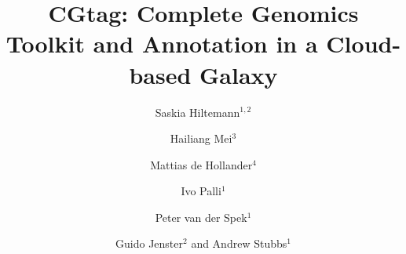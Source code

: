 \documentclass[10pt]{bmc_article}
\newenvironment{bmcformat}{\begin{raggedright}\baselineskip20pt\sloppy\setboolean{publ}{false}}{\end{raggedright}\baselineskip20pt\sloppy}
\begin{document}
\begin{bmcformat}



\title{CGtag: Complete Genomics Toolkit and Annotation in a Cloud-based Galaxy}
 


\author{Saskia Hiltemann\correspondingauthor$^{1,2}$%
      \and
         Hailiang Mei$^3$%
       \and
         Mattias de Hollander$^4$%
       \and
         Ivo Palli$^1$%
       \and
         Peter van der Spek$^1$%
       \and
         Guido Jenster$^2$ %
       and
         Andrew Stubbs$^1$%
      }
      


\address{%
    \iid(1)Department of Bioinformatics, Erasmus MC, Rotterdam, %
         The Netherlands\\
    \iid(2)Department of Urology, Erasmus MC, Rotterdam, %
         The Netherlands\\    
    \iid(3)Netherlands Bioinformatics Center (NBIC), Nijmegen, The Netherlands \\
    \iid(4)Department of Microbial Ecology, Netherlands Institute of Ecology (NIOO-KNAW), Wageningen, The Netherlands 	
}%


\end{bmcformat}
\end{document}
